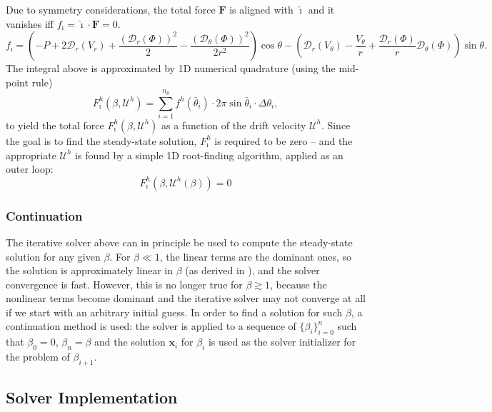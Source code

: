 \documentclass[preprint,10pt]{elsarticle}
\newcommand{\pars}[1]{\left(#1\right)}
\newcommand\bF{\boldsymbol{F}}
\newcommand\bx{\boldsymbol{x}}
\newcommand\cD{\mathcal{D}}
\newcommand\cU{\mathscr{U}}
\newcommand\ui{\boldsymbol{\hat{\imath}}}
\begin{document}
Due to symmetry considerations, the total force $\bF$ is 
aligned with $\ui$ and it vanishes iff $f_\imath = \ui \cdot \bF = 0$.
\begin{equation}
f_\imath = \pars{-P + 2\cD_r(V_r) + 
\frac{\pars{\cD_r(\varPhi)}^2}{2} - \frac{\pars{\cD_\theta(\varPhi)}^2}{2r^2}}\cos\theta 
 -\pars{\cD_r(V_\theta) - \frac{V_\theta}{r}
+ \frac{\cD_r(\varPhi)}{r} \cD_{\theta}(\varPhi)}\sin\theta.
\end{equation}
The integral above is approximated by 1D numerical quadrature
(using the mid-point rule)
\begin{equation}
F_\imath^h(\beta, \cU^h) = \sum_{i=1}^{n_\theta} f^h(\bar\theta_i) \cdot 
              2 \pi \sin\bar\theta_i \cdot \Delta\theta_i,
\end{equation}
to yield the total force $F_\imath^h(\beta, \cU^h)$ as a function of the drift velocity $\cU^h$.
Since the goal is to find the steady-state solution, $F_\imath^h$ 
is required to be zero --
and the appropriate $\cU^h$ is found by a simple 1D root-finding algorithm,
applied as an outer loop:
\begin{equation} \label{eq:disc_zero_force}
F_\imath^h(\beta, \cU^h(\beta)) = 0
\end{equation}

\subsubsection{Continuation}

The iterative solver above can in principle be used 
to compute the steady-state solution for any given $\beta$.
For $\beta \ll 1$, the linear terms are the dominant ones, 
so the solution is approximately linear in $\beta$ 
(as derived in \cite{yariv2010migration}), and the solver convergence is fast.
However, this is no longer true for $\beta \gtrsim 1$, because the nonlinear terms become dominant
and the iterative solver may not converge at all if we start with an arbitrary initial guess.
In order to find a solution for such $\beta$, a continuation method is used:
the solver is applied to a sequence of $\{\beta_i\}_{i=0}^n$ such that $\beta_0 = 0$,
$\beta_n = \beta$ and the solution $\bx_i$ for $\beta_i$ is used as the solver initializer
for the problem of $\beta_{i+1}$.

\subsection{Solver Implementation}
\end{document}
